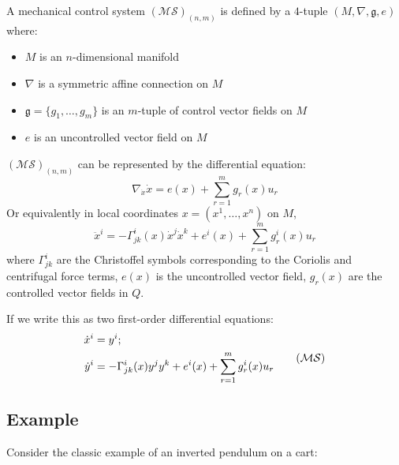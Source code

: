 \begin{defn}
    A mechanical control system $(\mathcal{MS})_{(n,m)}$ is defined by a $4$-tuple $(M, \nabla, \mathfrak{g}, e)$ where:
    \begin{itemize}
        \item $M$ is an $n$-dimensional manifold
        \item $\nabla$ is a symmetric affine connection on $M$
        \item $\mathfrak{g} = \{g_1, \dots, g_m\}$ is an $m$-tuple of control vector fields on $M$
        \item $e$ is an uncontrolled vector field on $M$
    \end{itemize}
    $(\mathcal{MS})_{(n,m)}$ can be represented by the differential equation:
    \begin{equation}
        \label{eq:mech}
        \nabla_{\dot{x}} \dot{x} = e(x) + \sum_{r=1}^m g_r(x) u_r 
    \end{equation}
    Or equivalently in local coordinates $x = (x^1, \dots, x^n)$ on $M$, 
    \begin{equation}\label{SODE-initial}
        \ddot{x}^i = - \Gamma ^i_{jk}(x)\dot{x}^j \dot{x}^k + e^i(x) + \sum_{r=1}^m g^i_r(x)u_r
    \end{equation}
    where $\Gamma^i_{jk}$ are the Christoffel symbols corresponding to the Coriolis and centrifugal force terms, $e(x)$ is the uncontrolled vector field, $g_r(x)$ are the controlled vector fields in $Q$.

    If we write this as two first-order differential equations:
    \begin{equation}\label{SODE-nonlinear}
        \begin{split}
            \dot{x}^i  &= y^i; \\
            \dot{y}^i  &= - \Gamma^i_{jk}(x)y^jy^k + e^i(x) + \sum_{r=1}^m g_r^i(x)u_r
        \end{split} \tag{$\mathcal{MS}$} 
    \end{equation}
\end{defn}

\newpage

\subsection{Example}

Consider the classic example of an inverted pendulum on a cart:

